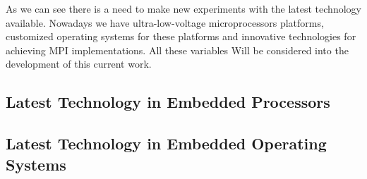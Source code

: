 As we can see there is a need to make new experiments with the latest
technology available. Nowadays we have ultra-low-voltage microprocessors
platforms, customized operating systems for these platforms and  innovative
technologies for achieving MPI implementations. All these variables Will be
considered into the development of this current work.

\subsection{Latest Technology in Embedded Processors}



\subsection{Latest Technology in Embedded Operating Systems}

\newpage

\clearpage
